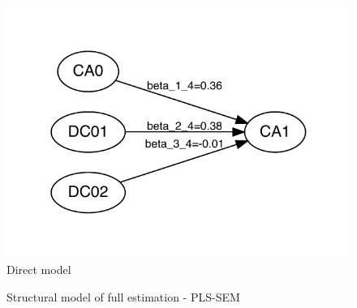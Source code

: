\documentclass[review,fleqn]{elsarticle}\usepackage[]{graphicx}\usepackage[]{color}
\begin{document}
\begin{figure}[ht]
\begin{minipage}[b]{0.5\linewidth}
  \end{minipage}
  \hfill
  \begin{minipage}[b]{0.5\linewidth}
    \includegraphics[width=.99\linewidth]{dir.pdf} 
    \caption{Direct model} 
  \end{minipage} 
\end{figure}


\begin{figure}
     \centering
  \caption{Structural model of full estimation - PLS-SEM}
  
\end{figure}
\end{document}
